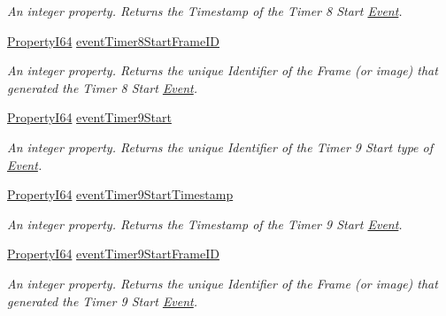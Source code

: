 \begin{DoxyCompactItemize}
\begin{DoxyCompactList}\small\item\em An integer property. Returns the Timestamp of the Timer 8 Start \hyperlink{classmv_i_m_p_a_c_t_1_1acquire_1_1_event}{Event}. \end{DoxyCompactList}\item 
\hyperlink{group___common_interface_ga81749b2696755513663492664a18a893}{Property\+I64} \hyperlink{classmv_i_m_p_a_c_t_1_1acquire_1_1_gen_i_cam_1_1_event_control_a3989544120c21d359c6bac197468218d}{event\+Timer8\+Start\+Frame\+I\+D}
\begin{DoxyCompactList}\small\item\em An integer property. Returns the unique Identifier of the Frame (or image) that generated the Timer 8 Start \hyperlink{classmv_i_m_p_a_c_t_1_1acquire_1_1_event}{Event}. \end{DoxyCompactList}\item 
\hyperlink{group___common_interface_ga81749b2696755513663492664a18a893}{Property\+I64} \hyperlink{classmv_i_m_p_a_c_t_1_1acquire_1_1_gen_i_cam_1_1_event_control_acfbcbd7beeea1fa304313ec99c6e5aa0}{event\+Timer9\+Start}
\begin{DoxyCompactList}\small\item\em An integer property. Returns the unique Identifier of the Timer 9 Start type of \hyperlink{classmv_i_m_p_a_c_t_1_1acquire_1_1_event}{Event}. \end{DoxyCompactList}\item 
\hyperlink{group___common_interface_ga81749b2696755513663492664a18a893}{Property\+I64} \hyperlink{classmv_i_m_p_a_c_t_1_1acquire_1_1_gen_i_cam_1_1_event_control_ae30f108ae7a05ae9904f44d927e59f64}{event\+Timer9\+Start\+Timestamp}
\begin{DoxyCompactList}\small\item\em An integer property. Returns the Timestamp of the Timer 9 Start \hyperlink{classmv_i_m_p_a_c_t_1_1acquire_1_1_event}{Event}. \end{DoxyCompactList}\item 
\hyperlink{group___common_interface_ga81749b2696755513663492664a18a893}{Property\+I64} \hyperlink{classmv_i_m_p_a_c_t_1_1acquire_1_1_gen_i_cam_1_1_event_control_a19031e57766532bad6658c8d1346c945}{event\+Timer9\+Start\+Frame\+I\+D}
\begin{DoxyCompactList}\small\item\em An integer property. Returns the unique Identifier of the Frame (or image) that generated the Timer 9 Start \hyperlink{classmv_i_m_p_a_c_t_1_1acquire_1_1_event}{Event}. \end{DoxyCompactList}\item 

\end{DoxyCompactItemize}
